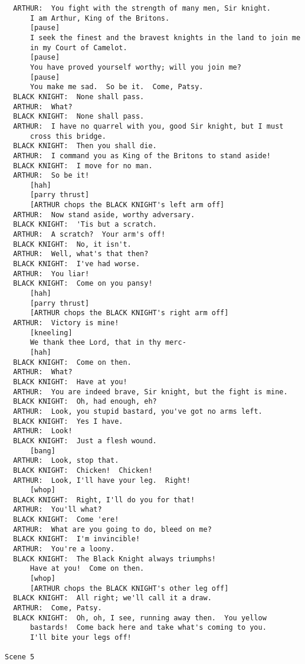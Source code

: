\documentclass{article}
\begin{document}
\begin{verbatim}
  ARTHUR:  You fight with the strength of many men, Sir knight.
      I am Arthur, King of the Britons.
      [pause]
      I seek the finest and the bravest knights in the land to join me
      in my Court of Camelot.
      [pause]
      You have proved yourself worthy; will you join me?
      [pause]
      You make me sad.  So be it.  Come, Patsy.
  BLACK KNIGHT:  None shall pass.
  ARTHUR:  What?
  BLACK KNIGHT:  None shall pass.
  ARTHUR:  I have no quarrel with you, good Sir knight, but I must
      cross this bridge.
  BLACK KNIGHT:  Then you shall die.
  ARTHUR:  I command you as King of the Britons to stand aside!
  BLACK KNIGHT:  I move for no man.
  ARTHUR:  So be it!
      [hah]
      [parry thrust]
      [ARTHUR chops the BLACK KNIGHT's left arm off]
  ARTHUR:  Now stand aside, worthy adversary.
  BLACK KNIGHT:  'Tis but a scratch.
  ARTHUR:  A scratch?  Your arm's off!
  BLACK KNIGHT:  No, it isn't.
  ARTHUR:  Well, what's that then?
  BLACK KNIGHT:  I've had worse.
  ARTHUR:  You liar!
  BLACK KNIGHT:  Come on you pansy!
      [hah]
      [parry thrust]
      [ARTHUR chops the BLACK KNIGHT's right arm off]
  ARTHUR:  Victory is mine!
      [kneeling]
      We thank thee Lord, that in thy merc-
      [hah]
  BLACK KNIGHT:  Come on then.
  ARTHUR:  What?
  BLACK KNIGHT:  Have at you!
  ARTHUR:  You are indeed brave, Sir knight, but the fight is mine.
  BLACK KNIGHT:  Oh, had enough, eh?
  ARTHUR:  Look, you stupid bastard, you've got no arms left.
  BLACK KNIGHT:  Yes I have.
  ARTHUR:  Look!
  BLACK KNIGHT:  Just a flesh wound.
      [bang]
  ARTHUR:  Look, stop that.
  BLACK KNIGHT:  Chicken!  Chicken!
  ARTHUR:  Look, I'll have your leg.  Right!
      [whop]
  BLACK KNIGHT:  Right, I'll do you for that!
  ARTHUR:  You'll what?
  BLACK KNIGHT:  Come 'ere!
  ARTHUR:  What are you going to do, bleed on me?
  BLACK KNIGHT:  I'm invincible!
  ARTHUR:  You're a loony.
  BLACK KNIGHT:  The Black Knight always triumphs!
      Have at you!  Come on then.
      [whop]
      [ARTHUR chops the BLACK KNIGHT's other leg off]
  BLACK KNIGHT:  All right; we'll call it a draw.
  ARTHUR:  Come, Patsy.
  BLACK KNIGHT:  Oh, oh, I see, running away then.  You yellow
      bastards!  Come back here and take what's coming to you.
      I'll bite your legs off!

Scene 5


\end{verbatim}
\end{document}
